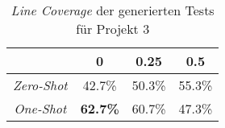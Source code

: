 \bgroup
\def\arraystretch{2}
\begin{table}[H]
	\vspace{.5cm}
	\centering		
	\begin{center}
		\begin{tabular}{|c||c|c|c|}
			\hline 
			& 0 & 0.25 & 0.5 \\
			\hline 
			\hline
			\textit{Zero-Shot} & 42.7\% & 50.3\% & 55.3\% \\
			\hline
			\textit{One-Shot} & \textbf{62.7\%} & 60.7\% & 47.3\% \\
			\hline
		\end{tabular} 
	\end{center}
	\caption{\textit{Line Coverage} der generierten Tests für Projekt 3}
	\label{fig:line-3}
	\vspace{-.8cm}
\end{table}
\egroup